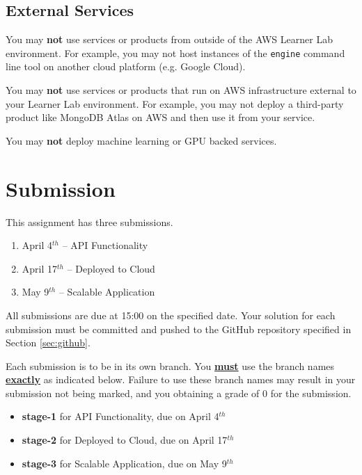\documentclass{csse4400}
\begin{document}
\subsection{External Services}
You may \textbf{not} use services or products from outside of the AWS Learner Lab environment.
For example, you may not host instances of the \texttt{engine} command line tool on another cloud platform
(e.g. Google Cloud).

You may \textbf{not} use services or products that run on AWS infrastructure external to your Learner Lab environment.
For example, you may not deploy a third-party product like MongoDB Atlas on AWS and then use it from your service.

You may \textbf{not} deploy machine learning or GPU backed services.


\section{Submission}
This assignment has three submissions.

\begin{enumerate}[topsep=7pt,partopsep=2pt,itemsep=4pt,parsep=4pt]
  \item April 4$^{th}$ -- API Functionality
  \item April 17$^{th}$ -- Deployed to Cloud
  \item May 9$^{th}$ -- Scalable Application
\end{enumerate}
All submissions are due at 15:00 on the specified date.
Your solution for each submission must be committed and pushed to the GitHub repository specified in Section \ref{sec:github}.

Each submission is to be in its own branch.
You \textbf{\underline{must}} use the branch names \textbf{\underline{exactly}} as indicated below.
Failure to use these branch names may result in your submission not being marked,
and you obtaining a grade of 0 for the submission.
\begin{itemize}[topsep=7pt,partopsep=2pt,itemsep=4pt,parsep=4pt]
  \item \textbf{stage-1} for API Functionality, due on April 4$^{th}$
  \item \textbf{stage-2} for Deployed to Cloud, due on April 17$^{th}$
  \item \textbf{stage-3} for Scalable Application, due on May 9$^{th}$
\end{itemize}
\end{document}
